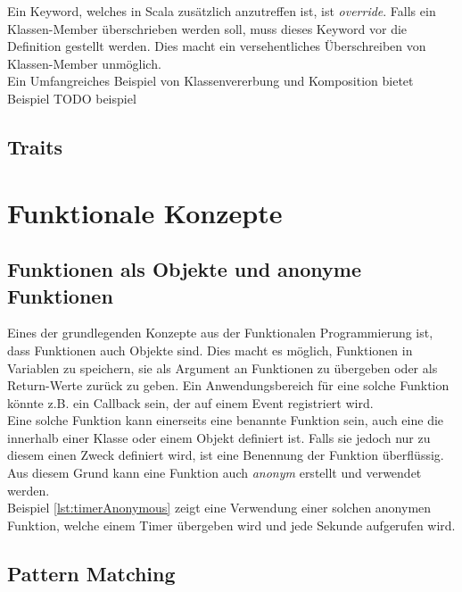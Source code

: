Ein Keyword, welches in Scala zusätzlich anzutreffen ist, ist 
\emph{override}. Falls ein Klassen-Member überschrieben werden soll,
muss dieses Keyword vor die Definition gestellt werden. Dies macht
ein versehentliches Überschreiben von Klassen-Member unmöglich.\\

Ein Umfangreiches Beispiel von Klassenvererbung und Komposition bietet
Beispiel TODO beispiel

\subsection{Traits}




\section{Funktionale Konzepte}

\subsection{Funktionen als Objekte und anonyme Funktionen}
\label{sec:functionsObjects}

Eines der grundlegenden Konzepte aus der Funktionalen Programmierung ist,
dass Funktionen auch Objekte sind. Dies macht es möglich, Funktionen
in Variablen zu speichern, sie als Argument an Funktionen zu übergeben
oder als Return-Werte zurück zu geben. Ein Anwendungsbereich für eine
solche Funktion könnte z.B. ein Callback sein, der auf einem Event
registriert wird.\\

Eine solche Funktion kann einerseits eine benannte Funktion sein,
auch eine die innerhalb einer Klasse oder einem Objekt definiert ist.
Falls sie jedoch nur zu diesem einen Zweck definiert wird, ist eine 
Benennung der Funktion überflüssig. Aus diesem Grund kann eine Funktion
auch \emph{anonym} erstellt und verwendet werden.\\

Beispiel \ref{lst:timerAnonymous} zeigt eine Verwendung einer solchen 
anonymen Funktion, welche einem Timer übergeben wird und jede Sekunde
aufgerufen wird. \\


\subsection{Pattern Matching}

